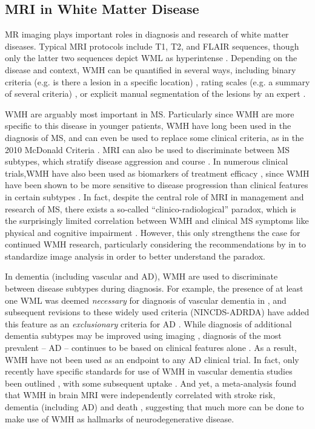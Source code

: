\subsection{MRI in White Matter Disease}
MR imaging plays important roles in diagnosis and research of white matter diseases.
Typical MRI protocols include T1, T2, and FLAIR sequences,
though only the latter two sequences depict WML as hyperintense \cite{Simon2006,Wardlaw2013}.
Depending on the disease and context, WMH can be quantified in several ways,
including binary criteria (e.g. is there a lesion in a specific location) \cite{Polman2011},
rating scales (e.g. a summary of several criteria) \cite{Fazekas1987},
or explicit manual segmentation of the lesions by an expert \cite{Egger2017}.
\par
WMH are arguably most important in MS.
Particularly since WMH are more specific to this disease in younger patients,
WMH have long been used in the diagnosis of MS,
and can even be used to replace some clinical criteria,
as in the 2010 McDonald Criteria \cite{Polman2011}.
MRI can also be used to discriminate between MS subtypes,
which stratify disease aggression and course \cite{Polman2011,Lublin2014,Traboulsee2015}.
In numerous clinical trials,WMH have also been used as biomarkers of treatment efficacy
\cite{Sormani2013,Fahrbach2013,Ziemssen2015},
since WMH have been shown to be more sensitive to disease progression than clinical features
in certain subtypes \cite{ORiordan1998}.
In fact, despite the central role of MRI in management and research of MS,
there exists a so-called ``clinico-radiological'' paradox,
which is the surprisingly limited correlation between WMH and clinical MS symptoms
like physical and cognitive impairment \cite{Mollison2017}.
However, this only strengthens the case for continued WMH research,
particularly considering the recommendations by \citeauthor{Mollison2017} in \cite{Mollison2017}
to standardize image analysis in order to better understand the paradox.
\par
In dementia (including vascular and AD),
WMH are used to discriminate between disease subtypes during diagnosis.
For example, the presence of at least one WML was deemed \textit{necessary}
for diagnosis of vascular dementia in \citeyear{Roman1993} \cite{Roman1993},
and subsequent revisions to these widely used criteria (NINCDS-ADRDA)
have added this feature as an \textit{exclusionary} criteria for AD \cite{Dubois2007}.
While diagnosis of additional dementia subtypes may be improved using imaging
\cite{Sorbi2012,Verhagen2016}, diagnosis of the most prevalent -- AD --
continues to be based on clinical features alone \cite{McKhann2011}.
As a result, WMH have not been used as an endpoint to any AD clinical trial.
In fact, only recently have specific standards for
use of WMH in vascular dementia studies been outlined \cite{Wardlaw2013,Wardlaw2015},
with some subsequent uptake \cite{VanWesten2016}.
And yet, a \citeyear{Debette2010} meta-analysis found that
WMH in brain MRI were independently correlated with
stroke risk, dementia (including AD) and death \cite{Debette2010},
suggesting that much more can be done to make use of WMH as hallmarks of neurodegenerative disease.
